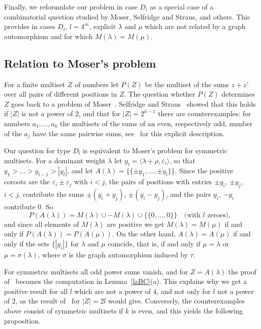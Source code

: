 \documentclass[11pt,a4paper]{article}
\theoremstyle{plain}
\theoremstyle{definition}
\newcommand{\mset}[1]{\{\!\{ #1 \}\!\}}
\begin{document}
Finally, we reformulate our problem in case $D_l$ as a special case of a
combinatorial question studied by Moser, Selfridge and Straus, and others. This provides in cases $D_l$, $l = 4^m$,
explicit $\lambda$ and $\mu$ which are not related by a graph automorphism
and for which $M(\lambda) = M(\mu)$.

\subsection*{Relation to Moser's problem}

For a finite multiset $Z$ of numbers let $P(Z)$ be the multiset of the
sums $z + z'$ over all pairs of different positions in $Z$. The question
whether $P(Z)$ determines $Z$ goes back to a problem of
Moser~\cite{moser}. Selfridge and Straus~\cite[Thm.~1, Thm.~2]{selfstraus}
showed that this holds if $|Z|$ is not a power of $2$, and that for $|Z| =
2^{k-1}$ there are counterexamples: for numbers $a_1, \ldots, a_k$ the
multisets of the sums of an even, respectively odd, number of the $a_j$
have the same pairwise sums, see~\cite[\S6]{gordonfs} for this explicit
description.

Our question for type $D_l$ is equivalent to Moser's problem for
symmetric multisets. For a dominant weight $\lambda$ let $y_i = \langle
\lambda + \rho, \varepsilon_i \rangle$, so that $y_1 > \ldots > y_{l-1} >
|y_l|$, and let $A(\lambda) = \mset{\pm y_1, \ldots, \pm y_l}$. Since the
positive coroots are the $\varepsilon_i \pm \varepsilon_j$ with $i < j$,
the pairs of positions with entries $\pm y_i$, $\pm y_j$, $i < j$,
contribute the sums $\pm(y_i + y_j)$, $\pm(y_i - y_j)$, and the pairs
$y_i$, $-y_i$ contribute $0$. So
\[ P(A(\lambda)) = M(\lambda) \cup -M(\lambda) \cup \mset{0, \ldots, 0}
\quad \textrm{(with $l$ zeroes)}, \]
and since all elements of $M(\lambda)$ are positive we get $M(\lambda) =
M(\mu)$ if and only if $P(A(\lambda)) = P(A(\mu))$. On the other hand,
$A(\lambda) = A(\mu)$ if and only if the sets $\{|y_i|\}$ for $\lambda$ and
$\mu$ coincide, that is, if and only if $\mu = \lambda$ or $\mu =
\sigma(\lambda)$, where $\sigma$ is the graph automorphism induced by
$\tau$.

For symmetric multisets all odd power sums vanish, and for $Z = A(\lambda)$
the proof of~\cite[Thm.~1]{selfstraus} becomes the computation in
Lemma~\ref{laBC}(a). This explains why we get a positive result for all $l$
which are not a power of $4$, and not only for $l$ not a power of $2$, as
the result of~\cite{selfstraus} for $|Z| = 2l$ would give. Conversely, the
counterexamples above consist of symmetric multisets if $k$ is even, and
this yields the following proposition.
\end{document}
